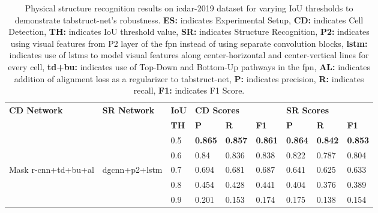 \documentclass[runningheads]{llncs}
\begin{document}
\begin{table}
\addtolength{\tabcolsep}{-1.0pt}
\begin{center}
\begin{tabular}{|l |l| l| l l l| l l l|} \hline
\textbf{CD Network} & \textbf{SR Network} &\textbf{IoU} &\multicolumn{3}{l|}{\textbf{CD Scores}} &\multicolumn{3}{l|}{\textbf{SR Scores}} \\ \cline{4-9}
 &  &\textbf{TH} &\textbf{P} &\textbf{R} &\textbf{F1} &\textbf{P} &\textbf{R} &\textbf{F1} \\ \hline
 &  &0.5	&\textbf{0.865} &\textbf{0.857} &\textbf{0.861} &\textbf{0.864} &\textbf{0.842} &\textbf{0.853} \\  
 &      &0.6 &0.84	&0.836	&0.838	&0.822	&0.787	&0.804 \\
Mask {\sc r-cnn}+{\sc td}+{\sc bu}+{\sc al} &{\sc dgcnn}+{\sc p}2+{\sc lstm}  &0.7 &0.694 &0.681 &0.687 &0.641	&0.625 &0.633  \\
 &      &0.8 &0.454	&0.428 &0.441 &0.404 &0.376	&0.389 \\
 &      &0.9 &0.201	&0.153 &0.174 &0.175 &0.138	&0.154 \\ \hline
 \end{tabular}
\end{center}
\caption{Physical structure recognition results on {\sc icdar}-2019 dataset for varying IoU thresholds to demonstrate {\sc t}ab{\sc s}truct-{\sc n}et's robustness. \textbf{ES:} indicates Experimental Setup, \textbf{CD:} indicates Cell Detection, \textbf{TH:} indicates IoU threshold value, \textbf{SR:} indicates Structure Recognition, \textbf{P2:} indicates using visual features from P2 layer of the {\sc fpn} instead of using separate convolution blocks, \textbf{{\sc lstm}:} indicates use of {\sc lstm}s to model visual features along center-horizontal and center-vertical lines for every cell, \textbf{{\sc td}+{\sc bu}:} indicates use of Top-Down and Bottom-Up pathways in the {\sc fpn}, \textbf{AL:} indicates addition of alignment loss as a regularizer to {\sc t}ab{\sc s}truct-{\sc n}et, \textbf{P:} indicates precision, \textbf{R:} indicates recall, \textbf{F1:} indicates F1 Score. \label{table_varying_ious_physical_icdar_2019}}
\vspace{-1em}
\end{table}
\end{document}
